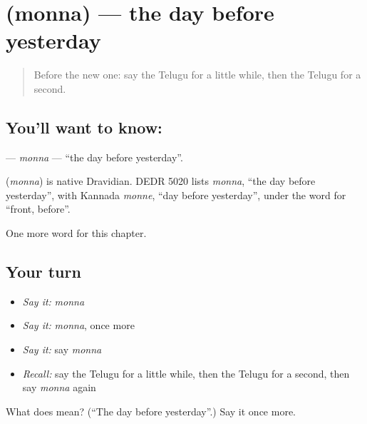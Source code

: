 \section[\texorpdfstring{\te{మొన్న} (monna)}{మొన్న (monna)}]{ (monna) — the day before yesterday}

\label{lesson:TE-C213-monna}



\begin{quote}
Before the new one: say the Telugu for a little while, then the Telugu for a second.
\end{quote}

\subsection*{You'll want to know: }
\textbf{} — \emph{monna} — \textquotedblleft{}the day before yesterday\textquotedblright{}.

\begin{cousinweb}
\textbf{} (\emph{monna}) is native Dravidian. DEDR 5020 lists \emph{monna}, \textquotedblleft{}the day before yesterday\textquotedblright{}, with Kannada \emph{monne}, \textquotedblleft{}day before yesterday\textquotedblright{}, under the word for \textquotedblleft{}front, before\textquotedblright{}.
\end{cousinweb}

\begin{grammarlens}[title={What you've built}]
One more word for this chapter.
\end{grammarlens}

\subsection*{Your turn}
\begin{itemize}
\raggedright
  \item \emph{Say it:} \emph{monna}
  \item \emph{Say it:} \emph{monna}, once more
  \item \emph{Say it:} say \emph{monna}
  \item \emph{Recall:} say the Telugu for a little while, then the Telugu for a second, then say \emph{monna} again
\end{itemize}

\begin{tcolorbox}[breakable,colback=teal!4,colframe=teal!35!black,title={Before you move on}]
What does  mean? (\textquotedblleft{}The day before yesterday\textquotedblright{}.) Say it once more.
\end{tcolorbox}
